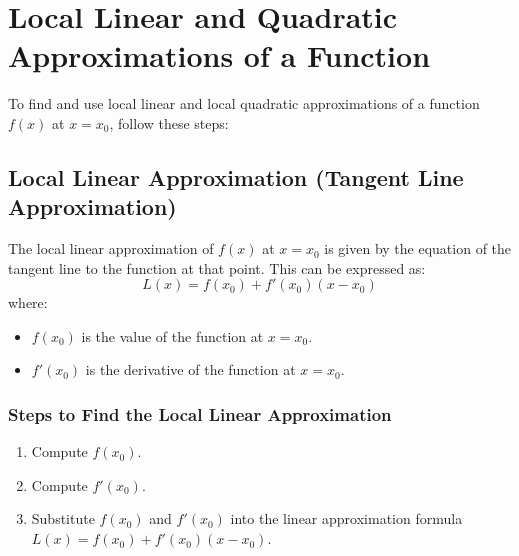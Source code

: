 \documentclass{article}
\begin{document}
\section*{Local Linear and Quadratic Approximations of a Function}

To find and use local linear and local quadratic approximations of a function \( f(x) \) at \( x = x_0 \), follow these steps:

\subsection*{Local Linear Approximation (Tangent Line Approximation)}
The local linear approximation of \( f(x) \) at \( x = x_0 \) is given by the equation of the tangent line to the function at that point. This can be expressed as:
\[ L(x) = f(x_0) + f'(x_0)(x - x_0) \]
where:
\begin{itemize}
\item \( f(x_0) \) is the value of the function at \( x = x_0 \).
\item \( f'(x_0) \) is the derivative of the function at \( x = x_0 \).
\end{itemize}

\begin{center}
\end{center}

\subsubsection*{Steps to Find the Local Linear Approximation}
\begin{enumerate}
\item Compute \( f(x_0) \).
\item Compute \( f'(x_0) \).
\item Substitute \( f(x_0) \) and \( f'(x_0) \) into the linear approximation formula \( L(x) = f(x_0) + f'(x_0)(x - x_0) \).
\end{enumerate}
\end{document}
